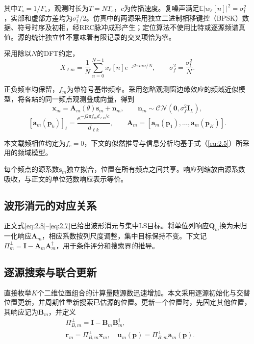 \documentclass[11pt,a4paper]{article}
\numberwithin{equation}{section}
\numberwithin{figure}{section}
\numberwithin{table}{section}
\begin{document}
其中$T_s=1/F_s$，观测时长为$T=NT_s$，$c$为传播速度。复噪声满足$\mathbb{E}|w_\ell[n]|^2=\sigma_t^2$，实部和虚部方差均为$\sigma_t^2/2$。仿真中的两源采用独立二进制相移键控（BPSK）数据、符号时序及初相，经RRC脉冲成形产生；定位算法不使用比特或逐源频谱真值。源的统计独立性不意味着有限记录的交叉项恰为零。

采用除以$N$的DFT约定，
\begin{equation}\label{eq:2.4}
X_{\ell m} =\frac{1}{N}\sum_{n=0}^{N-1}x_\ell[n]e^{-j2\pi mn/N}, \qquad \sigma_f^2=\frac{\sigma_t^2}{N}.
\end{equation}

正负频率均保留，$f_m$为带符号基带频率。采用忽略观测窗边缘效应的频域近似模型\cite{ref04,ref05}，将各站的同一频点观测叠成向量，得到
\begin{equation}\label{eq:2.5}
\mathbf{x}_m =\mathbf{A}_m(\theta)\mathbf{s}_m +\mathbf{n}_m, \qquad \mathbf{n}_m\sim\mathcal{CN}(\mathbf{0},\sigma_f^2\mathbf{I}_L),
\end{equation}
\begin{equation}\label{eq:2.6}
[\mathbf{a}_m(\mathbf{p}_k)]_\ell =\frac{e^{-j2\pi f_m d_{\ell k}/c}}{d_{\ell k}}, \qquad \mathbf{A}_m=[\mathbf{a}_m(\mathbf{p}_1),\ldots,\mathbf{a}_m(\mathbf{p}_K)].
\end{equation}

本文载频相位约定为$f_c=0$，下文的似然推导与信息分析均基于式（\ref{eq:2.5}）所采用的频域模型。

每个频点的源系数$\mathbf{s}_m$独立拟合，位置在所有频点之间共享。响应列缩放由源系数吸收，与正文的单位范数响应表示等价。

\subsection{波形消元的对应关系}\label{sec:2.3}
正文式\eqref{eq:2.8}--\eqref{eq:2.7}已给出波形消元与集中LS目标。将单位列响应$\mathbf Q_m$换为未归一化响应$\mathbf A_m$，相应系数按列尺度调整，集中目标保持不变。下文记$\Pi_m^\perp=\mathbf I-\mathbf A_m\mathbf A_m^\dagger$，用于条件评分和搜索界的推导。

\subsection{逐源搜索与联合更新}\label{sec:2.4}

直接枚举$K$个二维位置组合的计算量随源数迅速增加。本文采用逐源初始化与交替位置更新，并周期性重新搜索已估源的位置。更新一个位置时，先固定其他位置，其响应记为$\mathbf{B}_m$，并定义
\begin{equation}\label{eq:2.11}
\begin{aligned}
&\Pi_{B,m}^\perp =\mathbf{I}-\mathbf{B}_m\mathbf{B}_m^\dagger, \\
& \mathbf{r}_m=\Pi_{B,m}^\perp\mathbf{x}_m, \quad \mathbf{u}_m(\mathbf{p})=\Pi_{B,m}^\perp\mathbf{a}_m(\mathbf{p}).
\end{aligned}
\end{equation}
\end{document}
